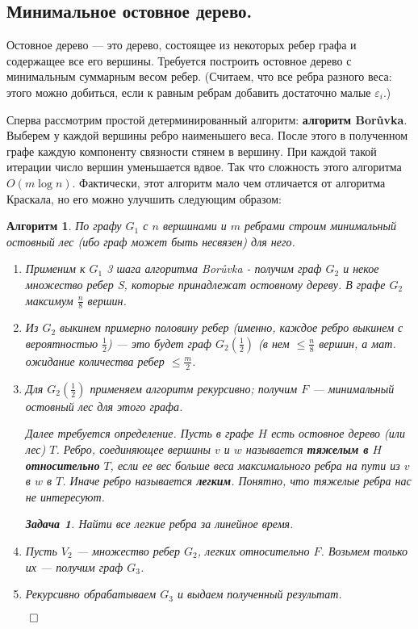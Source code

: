 \documentclass[a4paper]{article}
\theoremstyle{indented}
\newtheorem{alg}{Алгоритм}
\theoremstyle{definition}
\newtheorem{prob}{Задача}
\theoremstyle{remark}
\begin{document}
\subsection{Минимальное остовное дерево.} 

Остовное дерево --- это дерево, состоящее из некоторых ребер графа и
содержащее все его вершины. Требуется построить остовное дерево с
минимальным суммарным весом ребер. (Считаем, что все ребра разного
веса: этого можно добиться, если к равным ребрам добавить
достаточно малые $\varepsilon_i$.)

Сперва рассмотрим простой детерминированный алгоритм:
{\bf алгоритм Bor{\r u}vka}.
Выберем у каждой вершины ребро наименьшего веса. После этого в
полученном графе каждую компоненту связности стянем в вершину. При
каждой такой итерации число вершин уменьшается вдвое. Так что
сложность этого алгоритма $O(m\log{n})$. Фактически, этот алгоритм
мало чем отличается от алгоритма Краскала, но его можно улучшить
следующим образом: \\

\begin{alg}
По графу $G_1$ с $n$ вершинами и $m$ ребрами
строим минимальный остовный лес (ибо граф может быть
несвязен) для него.

\begin{enumerate}
\item Применим к $G_1$ 3 шага алгоритма Bor{\r u}vka - получим граф $G_2$ и
некое множество ребер S, которые принадлежат остовному дереву. В
графе $G_2$ максимум $\frac{n}{8}$ вершин.

\item Из $G_2$ выкинем примерно половину ребер (именно, каждое ребро
выкинем с вероятностью $\frac{1}{2}$) --- это будет граф
$G_2(\frac{1}{2})$ (в нем $\le\frac{n}{8}$ вершин,
а мат. ожидание количества ребер $\le\frac{m}{2}$.

\item Для $G_2(\frac{1}{2})$ применяем алгоритм рекурсивно; получим $F$ ---
минимальный остовный лес для этого графа.

\begin{center}
\small
Далее требуется определение. Пусть в графе $H$ есть остовное
дерево (или лес) $T$. Ребро, соединяющее вершины $v$ и $w$
называется {\bf тяжелым в } $H$ {\bf относительно } $T$, если ее
вес больше веса максимального ребра на пути из $v$ в $w$ в $T$.
Иначе ребро называется {\bf легким}. Понятно, что тяжелые ребра
нас не интересуют.

\begin{prob}
Найти все легкие ребра за линейное время.
\end{prob}
\end{center}

\item Пусть $V_2$ --- множество ребер $G_2$, легких относительно $F$.
Возьмем только их --- получим граф $G_3$.

\item Рекурсивно обрабатываем $G_3$ и выдаем полученный результат.

\end{enumerate}
\hfill$\qed$
\end{alg}
\end{document}
